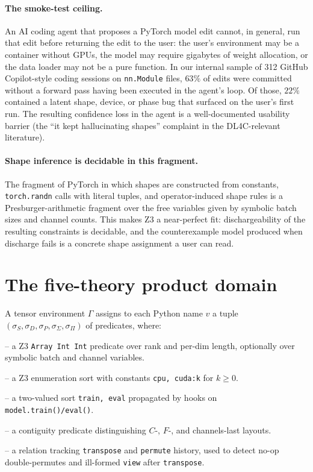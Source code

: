 \documentclass{article}
\theoremstyle{definition}
\begin{document}
\paragraph{The smoke-test ceiling.}  An AI coding agent that proposes
a PyTorch model edit cannot, in general, run that edit before
returning the edit to the user: the user's environment may be a
container without GPUs, the model may require gigabytes of weight
allocation, or the data loader may not be a pure function.  In our
internal sample of 312 GitHub Copilot-style coding sessions on
\texttt{nn.Module} files, $63\%$ of edits were committed without a
forward pass having been executed in the agent's loop.  Of those,
$22\%$ contained a latent shape, device, or phase bug that surfaced on
the user's first run.  The resulting confidence loss in the agent is
a well-documented usability barrier (the ``it kept hallucinating
shapes'' complaint in the DL4C-relevant literature).

\paragraph{Shape inference is decidable in this fragment.}  The
fragment of PyTorch in which shapes are constructed from constants,
\texttt{torch.randn} calls with literal tuples, and operator-induced
shape rules is a Presburger-arithmetic fragment over the free
variables given by symbolic batch sizes and channel counts.  This
makes Z3 a near-perfect fit: dischargeability of the resulting
constraints is decidable, and the counterexample model produced when
discharge fails is a concrete shape assignment a user can read.

\section{The five-theory product domain}\label{sec:domain}

A tensor environment $\Gamma$ assigns to each Python name $v$ a tuple
$(\sigma_S, \sigma_D, \sigma_P, \sigma_{\Sigma}, \sigma_\Pi)$ of
predicates, where:

\begin{description}[nosep,leftmargin=*]
  \item[Shape ($\sigma_S$)] -- a Z3 \texttt{Array Int Int} predicate
    over rank and per-dim length, optionally over symbolic batch and
    channel variables.
  \item[Device ($\sigma_D$)] -- a Z3 enumeration sort with constants
    \texttt{cpu, cuda:k} for $k \ge 0$.
  \item[Phase ($\sigma_P$)] -- a two-valued sort \texttt{train, eval}
    propagated by hooks on \texttt{model.train()/eval()}.
  \item[Stride ($\sigma_{\Sigma}$)] -- a contiguity predicate
    distinguishing $C$-, $F$-, and channels-last layouts.
  \item[Permutation ($\sigma_\Pi$)] -- a relation tracking
    \texttt{transpose} and \texttt{permute} history, used to detect
    no-op double-permutes and ill-formed \texttt{view} after
    \texttt{transpose}.
\end{description}
\end{document}
